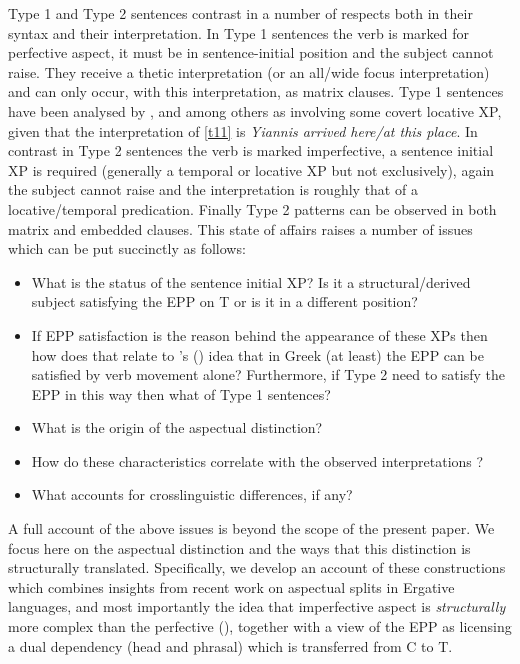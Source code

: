 \documentclass[11pt]{article}
\newcommand{\citeposs}[1]{\citeauthor{#1}'s (\citeyear{#1})}
\newcommand{\typa}{{Type 1}\xspace}
\newcommand{\typb}{{Type 2}\xspace}
\begin{document}
\typa and \typb sentences contrast in a number of respects both in their syntax and their interpretation.  In \typa sentences the verb is marked for perfective aspect, it must be in sentence-initial position and the subject cannot raise.  They receive a thetic interpretation (or an all/wide focus interpretation) and can only occur, with this interpretation, as matrix clauses.  \typa sentences have been analysed by \citet{pinto:97}, \citet{alexiadou:07} and \citet{sheehan:06} among others as involving some covert locative XP, given that the interpretation of \ref{t11} is \textit{ Yiannis arrived here/at this place}. In contrast in  \typb sentences the verb is marked imperfective, a sentence initial XP is required (generally a temporal or locative XP but not exclusively), again the subject cannot raise and the interpretation is roughly that of a locative/temporal predication.  Finally \typb patterns can be observed in both matrix and embedded clauses. This state of affairs raises a number of issues which can be put succinctly as follows:
\begin{itemize}
\item What is the status of the sentence initial XP?  Is it a structural/derived subject satisfying the EPP on T or is it in a different position?
\item If EPP satisfaction is the reason behind the appearance of these XPs then how does that relate to \citeposs{alexiadou-anagnostopoulou:98} idea that in Greek (at least) the EPP can be satisfied by verb movement alone?  Furthermore, if \typb need to satisfy the EPP in this way then what of \typa sentences?
\item What is the origin of the aspectual distinction?
\item How do these characteristics correlate with the observed interpretations ? 
\item What accounts for crosslinguistic differences, if any?
\end{itemize}

A full account of the above issues is beyond the scope of the present paper.  We focus here on the aspectual distinction and the ways that this distinction is structurally translated.
Specifically, we develop an account of these constructions which combines insights from recent work on aspectual splits in Ergative languages, and most importantly the idea that imperfective aspect is \textit{structurally} more complex than the perfective (\citet{kalin-vanurk:12}), together with a view of the EPP as licensing a dual dependency (head and phrasal) which is transferred from C to T.
\end{document}
